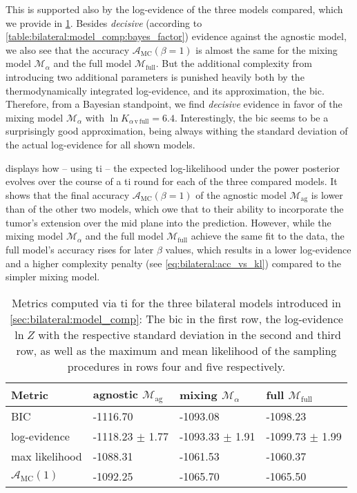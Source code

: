 \documentclass[\relativeRoot/main.tex]{subfiles}
\begin{document}
This is supported also by the log-evidence of the three models compared, which we provide in \cref{table:bilateral:model_comp:evidences}. Besides \emph{decisive} (according to \cref{table:bilateral:model_comp:bayes_factor}) evidence against the agnostic model, we also see that the accuracy $\mathcal{A}_\text{MC}(\beta=1)$ is almost the same for the mixing model $\mathcal{M}_\alpha$ and the full model $\mathcal{M}_\text{full}$. But the additional complexity from introducing two additional parameters is punished heavily both by the thermodynamically integrated log-evidence, and its approximation, the \gls{bic}. Therefore, from a Bayesian standpoint, we find \emph{decisive} evidence in favor of the mixing model $\mathcal{M}_\alpha$ with $\ln{K}_{\alpha\,\text{v}\,\text{full}} = 6.4$. Interestingly, the \gls{bic} seems to be a surprisingly good approximation, being always withing the standard deviation of the actual log-evidence for all shown models.

 displays how -- using \gls{ti} -- the expected log-likelihood under the power posterior evolves over the course of a \gls{ti} round for each of the three compared models. It shows that the final accuracy $\mathcal{A}_\text{MC}(\beta=1)$ of the agnostic model $\mathcal{M}_\text{ag}$ is lower than of the other two models, which owe that to their ability to incorporate the tumor's extension over the mid plane into the prediction. However, while the mixing model $\mathcal{M}_\alpha$ and the full model $\mathcal{M}_\text{full}$ achieve the same fit to the data, the full model's accuracy rises for later $\beta$ values, which results in a lower log-evidence and a higher complexity penalty (see \cref{eq:bilateral:acc_vs_kl}) compared to the simpler mixing model.

\begin{table}
    \centering
    \begin{tabular}{|l|l|l|l|}
        \hline
        \textbf{Metric} & \textbf{agnostic} $\mathcal{M}_\text{ag}$ & \textbf{mixing} $\mathcal{M}_\alpha$ & \textbf{full} $\mathcal{M}_\text{full}$ \\
        \hline
        BIC & -1116.70 & -1093.08 & -1098.23 \\
        log-evidence & -1118.23 $\pm$ 1.77 & -1093.33 $\pm$ 1.91 & -1099.73 $\pm$ 1.99 \\
        max likelihood & -1088.31 & -1061.53 & -1060.37 \\
        $\mathcal{A}_\text{MC}(1)$ & -1092.25 & -1065.70 & -1065.50 \\
        \hline
    \end{tabular}
    \caption{Metrics computed via \gls{ti} for the three bilateral models introduced in \cref{sec:bilateral:model_comp}: The \gls{bic} in the first row, the log-evidence $\ln{Z}$ with the respective standard deviation in the second and third row, as well as the maximum and mean likelihood of the sampling procedures in rows four and five respectively.}
    \label{table:bilateral:model_comp:evidences}
\end{table}
\end{document}
